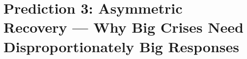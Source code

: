 \section{Prediction 3: Asymmetric Recovery --- Why Big Crises Need Disproportionately Big Responses}
\label{app:prediction-asymmetric}


\begin{abstract}
This appendix provides the complete technical foundation for Prediction 3 of the 
Complementarity-Context Framework: that recovery from coherence shocks is fundamentally 
asymmetric---small shocks recover quickly, large shocks recover slowly or not at all.
We develop the formal model of convex restoration costs, derive the critical coherence 
threshold $\underline{K}$, validate against historical recovery data (Japan's lost 
decades vs. Nordic recoveries), and establish the ``big push'' principle for crisis 
response. The analysis explains why similar policy interventions produce dramatically 
different outcomes depending on crisis severity.
\end{abstract}


